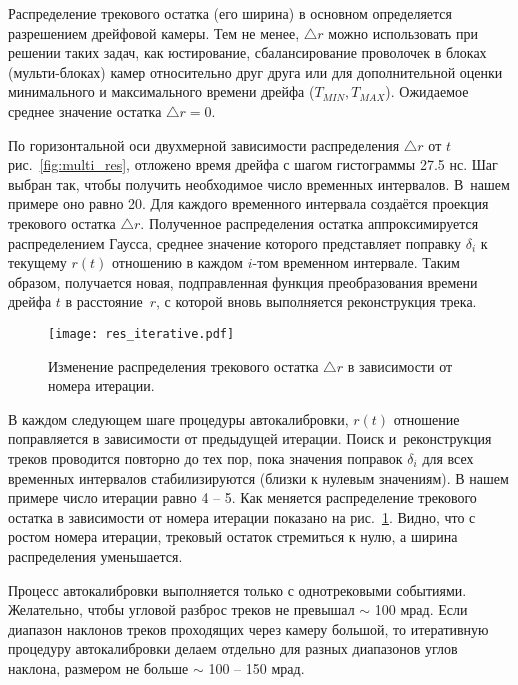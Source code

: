 Распределение трекового остатка (его ширина) в основном определяется
разрешением дрейфовой камеры. Тем не менее, $\triangle r$ можно использовать
при решении таких задач, как юстирование, сбалансирование проволочек в блоках
(мульти-блоках) камер относительно друг друга или для дополнительной оценки
минимального и максимального времени дрейфа ($T_{MIN}, T_{MAX}$). Ожидаемое
среднее значение остатка $\triangle r = 0$.

По горизонтальной оси двухмерной зависимости распределения $\triangle r$ от $t$
рис.~\ref{fig:multi_res}, отложено время дрейфа с шагом гистограммы 27.5 нс.
Шаг выбран так, чтобы получить необходимое число временных интервалов. В~нашем
примере оно равно 20. Для каждого временного интервала создаётся проекция
трекового остатка $\triangle r$. Полученное распределения остатка
аппроксимируется распределением Гаусса, среднее значение которого представляет
поправку $\delta_{i}$ к текущему $r(t)$ отношению в каждом $i$-том временном
интервале. Таким образом, получается новая, подправленная функция
преобразования времени дрейфа $t$ в расстояние~$r$, с которой вновь выполняется
реконструкция трека.

\begin{figure}[h]
  \begin{center}
    \texttt{[image: res\_iterative.pdf]}
    \caption {Изменение распределения трекового остатка $\triangle r$
      в зависимости от номера итерации.}
    \label{fig:residual}
  \end{center}
\end{figure}

В каждом следующем шаге процедуры автокалибровки, $r(t)$ отношение поправляется
в зависимости от предыдущей итерации. Поиск и~реконструкция треков проводится
повторно до тех пор, пока значения поправок $\delta_{i}$ для всех временных
интервалов стабилизируются (близки к нулевым значениям). В нашем примере число
итерации равно 4 -- 5. Как меняется распределение трекового остатка
в зависимости от номера итерации показано на рис.~\ref{fig:residual}. Видно,
что с ростом номера итерации, трековый остаток стремиться к нулю, а ширина
распределения уменьшается.

Процесс автокалибровки выполняется только с однотрековыми событиями.
Желательно, чтобы угловой разброс треков не превышал $\sim$ 100 мрад.
Если диапазон наклонов треков проходящих через камеру большой, то итеративную
процедуру автокалибровки делаем отдельно для разных диапазонов углов наклона,
размером не больше $\sim$ 100 -- 150 мрад.


